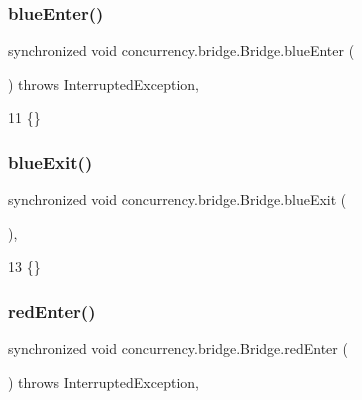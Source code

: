 \subsubsection{\texorpdfstring{blue\+Enter()}{blueEnter()}}
{\footnotesize\ttfamily synchronized void concurrency.\+bridge.\+Bridge.\+blue\+Enter (\begin{DoxyParamCaption}{ }\end{DoxyParamCaption}) throws Interrupted\+Exception\hspace{0.3cm}{\ttfamily [inline]}, {\ttfamily [package]}}


\begin{DoxyCode}
11 \{\}
\end{DoxyCode}
\mbox{\label{classconcurrency_1_1bridge_1_1_bridge_a7b2b68541d7c5f8843e442260b469e8e}} 
\subsubsection{\texorpdfstring{blue\+Exit()}{blueExit()}}
{\footnotesize\ttfamily synchronized void concurrency.\+bridge.\+Bridge.\+blue\+Exit (\begin{DoxyParamCaption}{ }\end{DoxyParamCaption})\hspace{0.3cm}{\ttfamily [inline]}, {\ttfamily [package]}}


\begin{DoxyCode}
13 \{\}
\end{DoxyCode}
\mbox{\label{classconcurrency_1_1bridge_1_1_bridge_a7982b9ef7be674502b81fa044e641fac}} 
\subsubsection{\texorpdfstring{red\+Enter()}{redEnter()}}
{\footnotesize\ttfamily synchronized void concurrency.\+bridge.\+Bridge.\+red\+Enter (\begin{DoxyParamCaption}{ }\end{DoxyParamCaption}) throws Interrupted\+Exception\hspace{0.3cm}{\ttfamily [inline]}, {\ttfamily [package]}}


